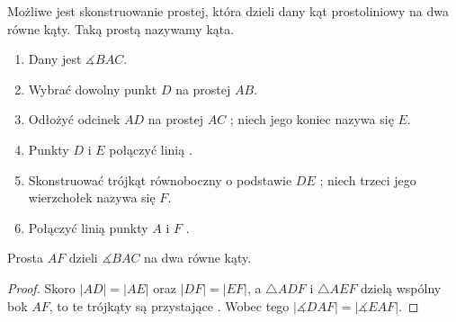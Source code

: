 \documentclass[12pt, a4paper]{scrartcl}
\begin{document}
\begin{theorem}
    Możliwe jest skonstruowanie prostej, która dzieli dany kąt prostoliniowy
    na dwa równe kąty. Taką prostą nazywamy  kąta.

    \begin{figure}[!ht]
        \begin{center}
        \end{center}
    \end{figure}

    \begin{enumerate}
        \item Dany jest \(\measuredangle BAC\).
        \item Wybrać dowolny punkt \(D\) na prostej \(AB\).
        \item Odłożyć odcinek \(AD\) na prostej \(AC\) ; niech jego
            koniec nazywa się \(E\).
        \item Punkty \(D\) i \(E\) połączyć linią .
        \item Skonstruować trójkąt równoboczny o podstawie \(DE\) ;
            niech trzeci jego wierzchołek nazywa się \(F\).
        \item Połączyć linią punkty \(A\) i \(F\) .
    \end{enumerate}

    Prosta \(AF\) dzieli \(\measuredangle BAC\) na dwa równe kąty.

    \begin{proof}
        Skoro \(|AD| = |AE|\) oraz \(|DF| = |EF|\), a \(\triangle ADF\) i
        \(\triangle AEF\) dzielą wspólny bok \(AF\), to te trójkąty są
        przystające . Wobec tego \(|\measuredangle DAF| =
        |\measuredangle EAF|\).

    \end{proof}
\end{theorem}
\end{document}
